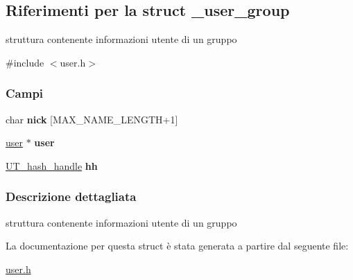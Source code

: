 \hypertarget{struct__user__group}{}\subsection{Riferimenti per la struct \+\_\+user\+\_\+group}
\label{struct__user__group}


struttura contenente informazioni utente di un gruppo  




{\ttfamily \#include $<$user.\+h$>$}

\subsubsection*{Campi}
\begin{DoxyCompactItemize}
\item 
\mbox{\label{struct__user__group_a1cd852622cab8c6248cac5c112e8770a}} 
char {\bfseries nick} \mbox{[}M\+A\+X\+\_\+\+N\+A\+M\+E\+\_\+\+L\+E\+N\+G\+TH+1\mbox{]}
\item 
\mbox{\label{struct__user__group_a6132beac13ccc5a81868c080817ff4c1}} 
\mbox{\hyperlink{struct__user}{user}} $\ast$ {\bfseries user}
\item 
\mbox{\label{struct__user__group_a1a9bcfb67c1d021b75faa362777becde}} 
\mbox{\hyperlink{structUT__hash__handle}{U\+T\+\_\+hash\+\_\+handle}} {\bfseries hh}
\end{DoxyCompactItemize}


\subsubsection{Descrizione dettagliata}
struttura contenente informazioni utente di un gruppo 

La documentazione per questa struct è stata generata a partire dal seguente file\+:\begin{DoxyCompactItemize}
\item 
\mbox{\hyperlink{user_8h}{user.\+h}}\end{DoxyCompactItemize}
